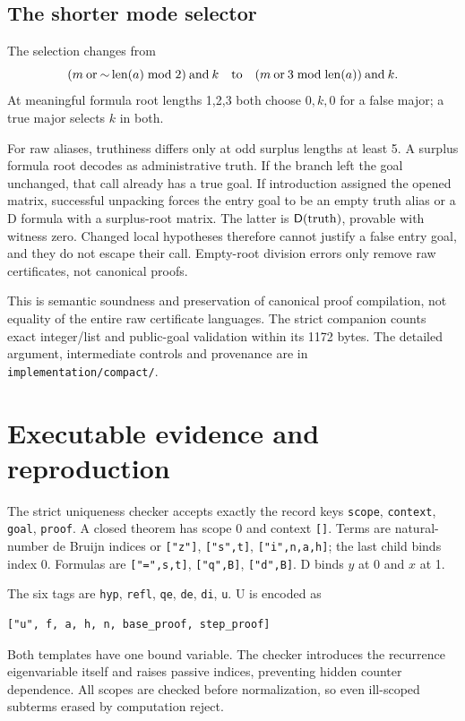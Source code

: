 \documentclass[11pt]{article}
\newcommand{\file}[1]{\nolinkurl{#1}}
\begin{document}
\subsection{The shorter mode selector}
The selection changes from
\[
 (m\mathbin{\mathrm{or}}\mathord{\sim}\operatorname{len}(a)\bmod2)
   \mathbin{\mathrm{and}}k
 \quad\hbox{to}\quad
 (m\mathbin{\mathrm{or}}3\bmod\operatorname{len}(a))
   \mathbin{\mathrm{and}}k.
\]
At meaningful formula root lengths 1,2,3 both choose $0,k,0$ for a
false major; a true major selects $k$ in both.

For raw aliases, truthiness differs only at odd surplus lengths at least
5. A surplus formula root decodes as administrative truth. If the
branch left the goal unchanged, that call already has a true goal.
If introduction assigned the opened matrix, successful unpacking forces
the entry goal to be an empty truth alias or a D formula with a
surplus-root matrix. The latter is $\mathsf D(\mathrm{truth})$, provable with
witness zero. Changed local hypotheses therefore cannot justify a false
entry goal, and they do not escape their call. Empty-root division
errors only remove raw certificates, not canonical proofs.

This is semantic soundness and preservation of canonical proof
compilation, not equality of the entire raw certificate languages.
The strict companion counts exact integer/list and public-goal
validation within its 1172 bytes. The detailed argument, intermediate
controls and provenance are in \file{implementation/compact/}.

\section{Executable evidence and reproduction}
The strict uniqueness checker accepts exactly the record keys
\file{scope}, \file{context}, \file{goal}, \file{proof}.
A closed theorem has scope 0 and context \file{[]}.
Terms are natural-number de Bruijn indices or
\file{["z"]}, \file{["s",t]}, \file{["i",n,a,h]};
the last child binds index 0.
Formulas are \file{["=",s,t]}, \file{["q",B]}, \file{["d",B]}.
D binds $y$ at 0 and $x$ at 1.

The six tags are \file{hyp}, \file{refl}, \file{qe}, \file{de},
\file{di}, \file{u}. U is encoded as
\begin{lstlisting}
["u", f, a, h, n, base_proof, step_proof]
\end{lstlisting}
Both templates have one bound variable. The checker introduces the
recurrence eigenvariable itself and raises passive indices, preventing
hidden counter dependence. All scopes are checked before normalization,
so even ill-scoped subterms erased by computation reject.
\end{document}
